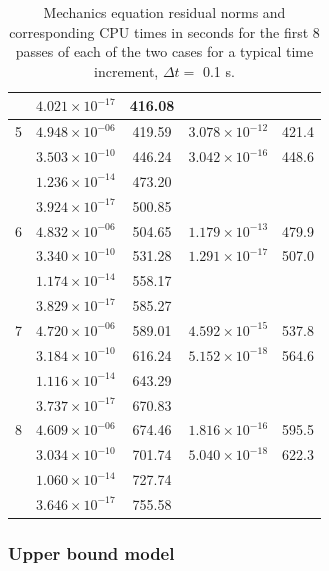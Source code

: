 \begin{table}
\begin{tabular}{|r|c|c|c|c|}
      & $ 4.021\times 10^{-17}$ &  416.08   & $                    $   &  \\
\hline                                    
5     & $ 4.948\times 10^{-06}$ &  419.59   & $3.078 \times 10^{-12}$  &  421.4 \\
      & $ 3.503\times 10^{-10}$ &  446.24   & $3.042 \times 10^{-16}$  &  448.6 \\
      & $ 1.236\times 10^{-14}$ &  473.20   & $                    $   &  \\
      & $ 3.924\times 10^{-17}$ &  500.85   & $                    $   &  \\
\hline                                    
6     & $ 4.832\times 10^{-06}$ &  504.65   & $1.179 \times 10^{-13}$  &  479.9 \\
      & $ 3.340\times 10^{-10}$ &  531.28   & $1.291 \times 10^{-17}$  &  507.0 \\
      & $ 1.174\times 10^{-14}$ &  558.17   & $                    $   &  \\
      & $ 3.829\times 10^{-17}$ &  585.27   & $                    $   &  \\
\hline                                    
7     & $ 4.720\times 10^{-06}$ &  589.01   & $4.592 \times 10^{-15}$  &  537.8 \\
      & $ 3.184\times 10^{-10}$ &  616.24   & $5.152 \times 10^{-18}$  &  564.6 \\
      & $ 1.116\times 10^{-14}$ &  643.29   & $                    $   &  \\
      & $ 3.737\times 10^{-17}$ &  670.83   & $                    $   &  \\
\hline                                    
8     & $ 4.609\times 10^{-06}$ &  674.46   & $1.816 \times 10^{-16}$  &  595.5  \\
      & $ 3.034\times 10^{-10}$ &  701.74   & $5.040 \times 10^{-18}$  &  622.3  \\
      & $ 1.060\times 10^{-14}$ &  727.74   & $                    $   &  \\
      & $ 3.646\times 10^{-17}$ &  755.58   & $                    $   &  \\
\hline
\end{tabular}
\caption{Mechanics equation residual norms and corresponding CPU times
  in seconds for the first 8 passes of each of the two cases for a
  typical time increment, $\Delta t=$ 0.1 s.}
\label{resnorms}
\end{table}

\subsubsection{Upper bound model}
\label{upper-bound}

